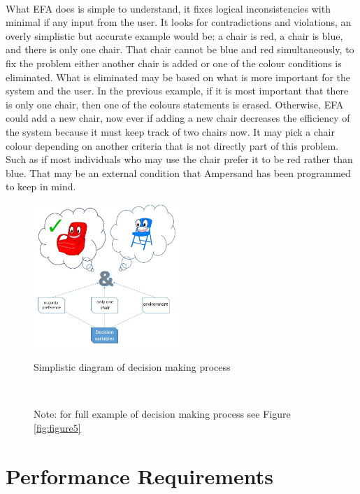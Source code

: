 \documentclass[12pt]{report}
\begin{document}
\paragraph*{}
What EFA does is simple to understand, it fixes logical inconsistencies with minimal if any 
input from the user. It looks for contradictions and violations, an overly simplistic but accurate 
example would be: a chair is red, a chair is blue, and there is only one chair. That chair cannot 
be blue and red simultaneously, to fix the problem either another chair is added or one of the 
colour conditions is eliminated. What is eliminated may be based on what is more important for the 
system and the user. In the previous example, if it is most important that there is only one chair, 
then one of the colours statements is erased. Otherwise, EFA could add a new chair, now ever if 
adding a new chair decreases the efficiency of the system because it must keep track of two chairs 
now. It may pick a chair colour depending on another criteria that is not directly part of this 
problem. Such as if most individuals who may use the chair prefer it to be red rather than blue. 
That may be an external condition that Ampersand has been programmed to keep in mind. 
\begin{figure}
	\centering
	\includegraphics[width=0.5\textwidth]{../figures/blueorredchair}
	\caption{Simplistic diagram of decision making process}
  {\captionsetup{font=small}\caption*{Note: for full example of decision making 
	process see Figure \ref{fig:figure5}}}~\label{fig:figure4}
\end{figure}

\section{Performance Requirements}\label{sec:Performance}
\end{document}
